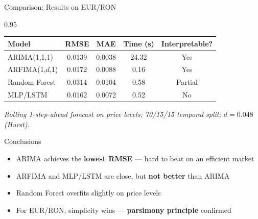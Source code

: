 \documentclass[9pt, aspectratio=169, t]{beamer}
\begin{document}
\begin{frame}{Comparison: Results on EUR/RON}
    \begin{cminipage}{0.95\textwidth}
    \begin{center}
    {\small
    \begin{tabular}{l|c|c|c|c}
        \toprule
        \textbf{Model} & \textbf{RMSE} & \textbf{MAE} & \textbf{Time (s)} & \textbf{Interpretable?} \\
        \midrule
        ARIMA(1,1,1) & 0.0139 & 0.0038 & 24.32 & Yes \\
        ARFIMA(1,$d$,1) & 0.0172 & 0.0088 & 0.16 & Yes \\
        Random Forest & 0.0314 & 0.0104 & 0.58 & Partial \\
        MLP/LSTM & 0.0162 & 0.0072 & 0.52 & No \\
        \bottomrule
    \end{tabular}
    }
    \end{center}
    {\scriptsize \textit{Rolling 1-step-ahead forecast on price levels; 70/15/15 temporal split; $d = 0.048$ (Hurst).}}

    \vspace{0.1cm}

    \begin{alertblock}{Conclusions}
        \begin{itemize}\setlength{\itemsep}{0pt}
            \item ARIMA achieves the \textbf{lowest RMSE} --- hard to beat on an efficient market
            \item ARFIMA and MLP/LSTM are close, but \textbf{not better} than ARIMA
            \item Random Forest overfits slightly on price levels
            \item For EUR/RON, simplicity wins --- \textbf{parsimony principle} confirmed
        \end{itemize}
    \end{alertblock}
    \end{cminipage}
\end{frame}
\end{document}
